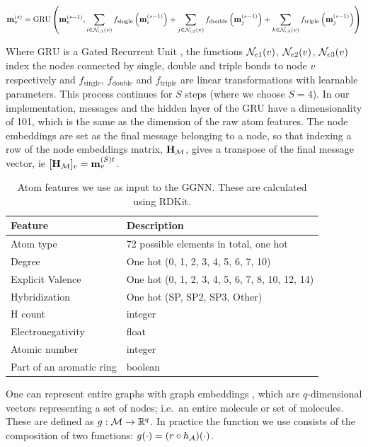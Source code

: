 \begin{align}
	{\mathbf{m}}_v^{(s)} = \textrm{GRU}\left( 
					{\mathbf{m}}_v^{(s - 1)},  
						\sum_{i \in \mathcal{N}_{e1}(v)} f_\textrm{single}\left({\mathbf{m}}_i^{(s - 1)}\right) +
						\sum_{j \in \mathcal{N}_{e2}(v)} f_\textrm{double}\left({\mathbf{m}}_j^{(s - 1)}\right) +
						\sum_{k \in \mathcal{N}_{e3}(v)} f_\textrm{triple}\left({\mathbf{m}}_j^{(s - 1)}\right)
					\right)
\end{align}

Where $\textrm{GRU}$ is a Gated Recurrent Unit \citep{Cho2014-xt}, the functions $\mathcal{N}_{e1}(v)$, $\mathcal{N}_{e2}(v)$, $\mathcal{N}_{e3}(v)$ index the nodes connected by single, double and triple bonds to node $v$ respectively and $f_\textrm{single}$, $f_\textrm{double}$ and $f_\textrm{triple}$ are linear transformations with learnable parameters.
This process continues for $S$ steps (where we choose $S=4$). In our implementation, messages and the hidden layer of the GRU have a dimensionality of 101, which is the same as the dimension of the raw atom features.
The node embeddings are set as the final message belonging to a node, so that indexing a row of the node embeddings matrix, ${\mathbf{H}}_{{\mathcal{M}}}$, gives a transpose of the final message vector, ie $[{\mathbf{H}}_{{\mathcal{M}}}]_v = {\mathbf{m}}_v^{(S)t}$.

\begin{table}
  \caption{Atom features we use as input to the GGNN. These are calculated using RDKit.}
  \label{table:atom-features}
  \centering
  \begin{tabular}{ll}
    \toprule
    Feature     & Description      \\
    \midrule
    Atom type & 72 possible elements in total, one hot  \\
    Degree     & One hot (0,   1,   2,   3,   4,   5,   6,   7,  10)  \\
    Explicit Valence     & One hot   (0,   1,   2,   3,   4,   5,   6,   7,   8,  10,  12,  14)    \\
    Hybridization & One hot (SP, SP2, SP3, Other) \\
    H count & integer \\
    Electronegativity & float \\
    Atomic number & integer \\
    Part of an aromatic ring & boolean\\
    \bottomrule
  \end{tabular}
\end{table}


One can represent entire graphs with graph embeddings \citep{li2018learning,Johnson2017-pd}, which are $q$-dimensional vectors representing a set of nodes; i.e.\ an entire molecule or set of molecules.
These are defined as $g: {\mathcal{M}} \to \mathbb{R}^{q}$. 
In practice the function we use consists of the composition of two functions: $g(\cdot) = (r \circ h_{{\mathcal{A}}})(\cdot)$.


